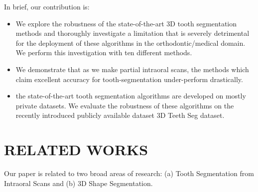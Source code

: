 \documentclass[letterpaper, 10 pt, conference]{ieeeconf}  %
\begin{document}
 In brief, our contribution is: 
\begin{itemize}
    \item We explore the robustness of the state-of-the-art 3D tooth segmentation methods and thoroughly investigate a limitation that is severely detrimental for the deployment of these algorithms in the orthodontic/medical domain. We perform this investigation with ten different methods.
    \item We demonstrate that as we make partial intraoral scans, the methods which claim excellent accuracy for tooth-segmentation under-perform drastically.
    \item the state-of-the-art tooth segmentation algorithms are developed on mostly private datasets. We evaluate the robustness of these algorithms on the recently introduced publicly available dataset 3D Teeth Seg dataset\cite{ben2022teeth3ds}.
\end{itemize}


\section{RELATED WORKS}
Our paper is related to two broad areas of research: (a) Tooth Segmentation from Intraoral Scans and (b) 3D Shape Segmentation. %
\end{document}
